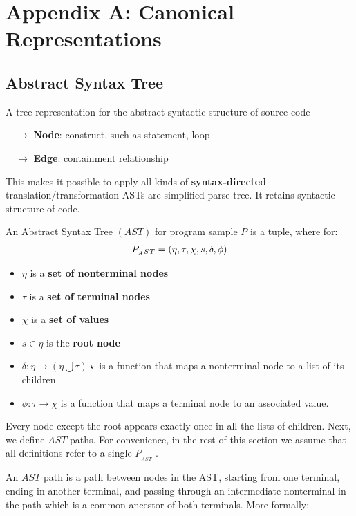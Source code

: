 \section{Appendix A: Canonical Representations}

\subsection{Abstract Syntax Tree}
A tree representation for the abstract syntactic structure of source code

$\quad \rightarrow$  \textbf{Node}: construct, such as statement, loop

$\quad \rightarrow$  \textbf{Edge}: containment relationship

This makes it possible to apply all kinds of \textbf{syntax-directed} translation/transformation ASTs are simplified parse tree. It retains syntactic structure of code.

 An Abstract Syntax Tree $(AST)$ for program sample $P$ is a tuple, where for:
%
\begin{align}
    \Large{P_{_A}{_S}{_T}} = ( \eta ,\tau ,\chi , s, \delta, \phi )
\end{align}

\begin{itemize}
  \item $\eta$ is a \textbf{set of nonterminal nodes}
  \item $\tau$ is a \textbf{set of terminal nodes}
  \item $\chi$ is a \textbf{set of values}
  \item $s \in \eta$ is the \textbf{root node}
  \item $\delta : \eta \rightarrow (\eta \bigcup \tau  )\star$ is a function that maps a nonterminal node to  a list of its children
  \item $\phi : \tau \rightarrow \chi$ is a function that maps a terminal node to an associated value.  
\end{itemize}

Every node except the root appears exactly once in all the lists of children. Next, we define $AST$ paths. For convenience, in the rest of this section we assume that all definitions refer to a single $P_{{_A}{_S}{_T}}$ .  

An $AST$ path is a path between nodes in the AST, starting from one terminal, ending in another terminal, and passing through an intermediate nonterminal in the path which is a common ancestor of both terminals. More formally:

